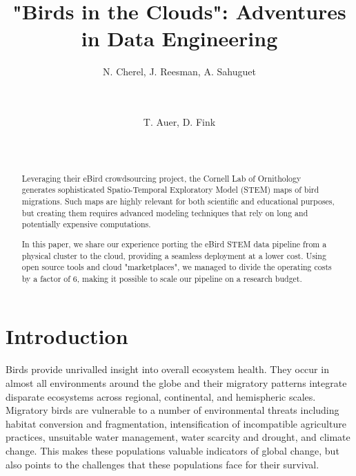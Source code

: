 \documentclass{acm_proc_article-sp}
\begin{document}

\title{"Birds in the Clouds": Adventures in Data Engineering}



\author{
\alignauthor
N. Cherel, J. Reesman, A. Sahuguet\\
       \\
       \\
\and
T. Auer,  D. Fink\\
       \\
       \\
}

\maketitle \begin{abstract}
Leveraging their eBird crowdsourcing project, the Cornell Lab of Ornithology generates sophisticated Spatio-Temporal Exploratory Model (STEM) maps of bird migrations. Such maps are highly relevant for both scientific and educational purposes, but creating them requires advanced modeling techniques that rely on long and potentially expensive computations.
    
In this paper, we share our experience porting the eBird STEM data pipeline from a physical cluster to the cloud, providing a seamless deployment at a lower cost. Using open source tools and cloud "marketplaces", we managed to divide the operating costs by a factor of 6, making it possible to scale our pipeline on a research budget.
\end{abstract}

\section{Introduction}\label{sec::intro}
Birds provide unrivalled insight into overall ecosystem health. They occur in almost all environments around the globe and their migratory patterns integrate disparate ecosystems across regional, continental, and hemispheric scales. Migratory birds are vulnerable to a number of environmental threats including habitat conversion and fragmentation, intensification of incompatible agriculture practices, unsuitable water management, water scarcity and drought, and climate change. This makes these populations valuable indicators of global change, but also points to the challenges that these populations face for their survival.
\end{document}
